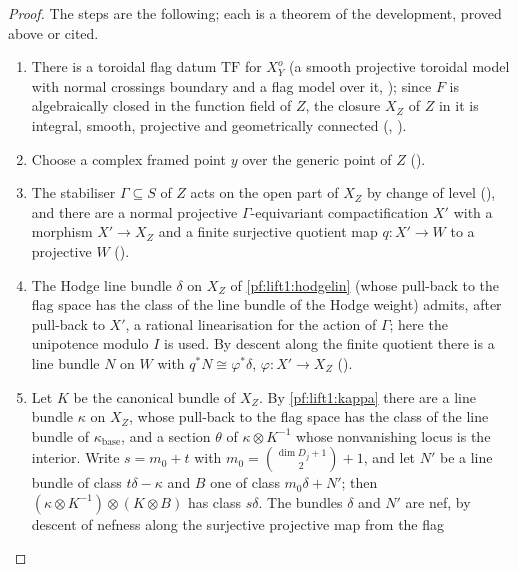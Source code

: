 \begin{proof}
The steps are the following; each is a theorem of the development, proved above or cited.
\begin{enumerate}[label=(\arabic*)]
\item There is a toroidal flag datum $\mathrm{TF}$ for $X^o_Y$ (a smooth projective toroidal model with
  normal crossings boundary and a flag model over it,
  ); since $F$ is algebraically closed in
  the function field of $Z$, the closure $X_Z$ of $Z$ in it is integral, smooth, projective and
  geometrically connected (,
  ).
\item Choose a complex framed point $y$ over the generic point of $Z$
  ().
\item The stabiliser $\Gamma\subseteq S$ of $Z$ acts on the open part of $X_Z$ by change of level
  (), and there are a normal
  projective $\Gamma$-equivariant compactification $X'$ with a morphism $X'\to X_Z$ and a finite surjective
  quotient map $q\colon X'\to W$ to a projective $W$
  ().
\item The Hodge line bundle $\delta$ on $X_Z$ of \cref{pf:lift1:hodgelin} (whose pull-back to the flag
  space has the class of the line bundle of the Hodge weight) admits, after pull-back to $X'$, a rational
  linearisation for the action of $\Gamma$; here the unipotence modulo $I$ is used. By descent along the
  finite quotient there is a line bundle $N$ on $W$ with $q^*N\cong\varphi^*\delta$, $\varphi\colon X'\to X_Z$
  ().
\item Let $K$ be the canonical bundle of $X_Z$. By \cref{pf:lift1:kappa} there are a line bundle $\kappa$ on
  $X_Z$, whose pull-back to the flag space has the class of the line bundle of $\kappa_{\mathrm{base}}$, and
  a section $\theta$ of $\kappa\otimes K^{-1}$ whose nonvanishing locus is the interior. Write $s=m_0+t$ with
  $m_0=\binom{\dim D_j+1}2+1$, and let $N'$ be a line bundle of class $t\delta-\kappa$ and $B$ one of class
  $m_0\delta+N'$; then $(\kappa\otimes K^{-1})\otimes(K\otimes B)$ has class $s\delta$. The bundles
  $\delta$ and $N'$ are nef, by descent of nefness along the surjective projective map from the flag

\end{enumerate}
\end{proof}
